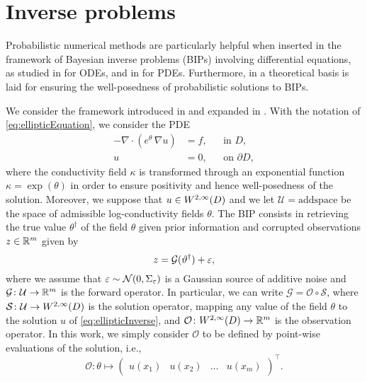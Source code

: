 \documentclass[10pt]{article}
\begin{document}
\section{Inverse problems}\label{sec:inverseproblems}

Probabilistic numerical methods are particularly helpful when inserted in the framework of Bayesian inverse problems (BIPs) involving differential equations, as studied in \cite{AbG20, CGS17} for ODEs, and in \cite{COS17, CCC16} for PDEs. Furthermore, in \cite{LST18} a theoretical basis is laid for ensuring the well-posedness of probabilistic solutions to BIPs.

We consider the framework introduced in \cite{Stu10} and expanded in \cite{DaS11}. With the notation of \eqref{eq:ellipticEquation}, we consider the PDE
\begin{equation}\label{eq:ellipticInverse}
\begin{aligned}
	-\nabla \cdot (e^\theta \, \nabla u) &= f, &&\text{in } D,\\
	u &= 0, &&\text{on } \partial D,
\end{aligned}
\end{equation}
where the conductivity field $\kappa$ is transformed through an exponential function $\kappa = \exp(\theta)$ in order to ensure positivity and hence well-posedness of the solution. Moreover, we suppose that $u \in W^{2, \infty}(D)$ and we let $\mathcal U = \mathrm{add space}$ be the space of admissible log-conductivity fields $\theta$. The BIP consists in retrieving the true value $\theta^\dagger$ of the field $\theta$ given prior information and corrupted observations $z \in \mathbb{R}^m$ given by
\begin{equation}
	z = \mathcal G(\vartheta^\dagger) + \varepsilon,
\end{equation}
where we assume that $\varepsilon \sim \mathcal N(0, \Sigma_\varepsilon)$ is a Gaussian source of additive noise and $\mathcal G \colon \mathcal U \to \mathbb{R}^m$ is the forward operator. In particular, we can write $\mathcal G = \mathcal O \circ \mathcal S$, where $\mathcal S \colon \mathcal U  \to W^{2, \infty}(D)$ is the solution operator, mapping any value of the field $\theta$ to the solution $u$ of \eqref{eq:ellipticInverse}, and $\mathcal O \colon W^{2, \infty}(D) \to \mathbb{R}^m$ is the observation operator. In this work, we simply consider $\mathcal O$ to be defined by point-wise evaluations of the solution, i.e., 
\begin{equation}
\mathcal O\colon \theta \mapsto \begin{pmatrix} u(x_1) & u(x_2) & \ldots & u(x_m) \end{pmatrix}^\top.
\end{equation} 
\end{document}

